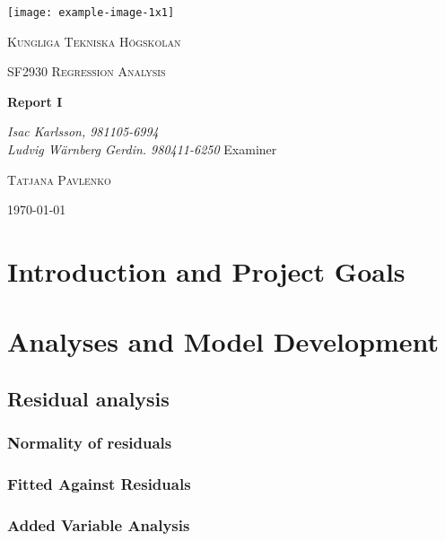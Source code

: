 \documentclass[11pt]{article}
\author{Ludde}
\date{\today}
\title{}
\begin{document}
\begin{titlepage}
\centering
\texttt{[image: example-image-1x1]}\par\vspace{1cm}
{\scshape\LARGE Kungliga Tekniska Högskolan \par}
\vspace{1cm}
{\scshape\Large SF2930 Regression Analysis \par}
\vspace{1.5cm}
{\huge\bfseries Report I \\  \par}
\vspace{2cm}
{\Large\itshape Isac Karlsson, 981105-6994\\ Ludvig Wärnberg Gerdin. 980411-6250}
\vfill
Examiner \par
\textsc{Tatjana Pavlenko}

\vfill

{\large \today\par}
\end{titlepage}

\newpage
\tableofcontents
\newpage

\section{Introduction and Project Goals}
\label{sec:orgf15e73f}
\section{Analyses and Model Development}
\label{sec:org0681761}
\subsection{Residual analysis}
\label{sec:orgf9023ce}
\subsubsection{Normality of residuals}
\label{sec:org2cf908d}

\subsubsection{Fitted Against Residuals}
\label{sec:orge4f79ff}

\subsubsection{Added Variable Analysis}
\label{sec:orgab1b1dc}
\end{document}
